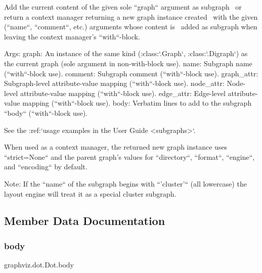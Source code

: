 \begin{DoxyVerb}Add the current content of the given sole ``graph`` argument as subgraph \
   or return a context manager returning a new graph instance created \
   with the given (``name``, ``comment``, etc.) arguments whose content is \
   added as subgraph when leaving the context manager's ``with``-block.

Args:
    graph: An instance of the same kind (:class:`.Graph`, :class:`.Digraph`)
   as the current graph (sole argument in non-with-block use).
    name: Subgraph name (``with``-block use).
    comment: Subgraph comment (``with``-block use).
    graph_attr: Subgraph-level attribute-value mapping (``with``-block use).
    node_attr: Node-level attribute-value mapping (``with``-block use).
    edge_attr: Edge-level attribute-value mapping (``with``-block use).
    body: Verbatim lines to add to the subgraph ``body`` (``with``-block use).

See the :ref:`usage examples in the User Guide <subgraphs>`.

When used as a context manager, the returned new graph instance uses
``strict=None`` and the parent graph's values for ``directory``,
``format``, ``engine``, and ``encoding`` by default.

Note:
    If the ``name`` of the subgraph begins with ``'cluster'`` (all lowercase)
    the layout engine will treat it as a special cluster subgraph.
\end{DoxyVerb}
 

\subsection{Member Data Documentation}
\mbox{\label{classgraphviz_1_1dot_1_1Dot_a445a58c4a1ec19e89778e3a9bf026415}} 
\subsubsection{\texorpdfstring{body}{body}}
{\footnotesize\ttfamily graphviz.\+dot.\+Dot.\+body}

\mbox{\label{classgraphviz_1_1dot_1_1Dot_af86327a4da464a67b07151e065c252b1}} 
